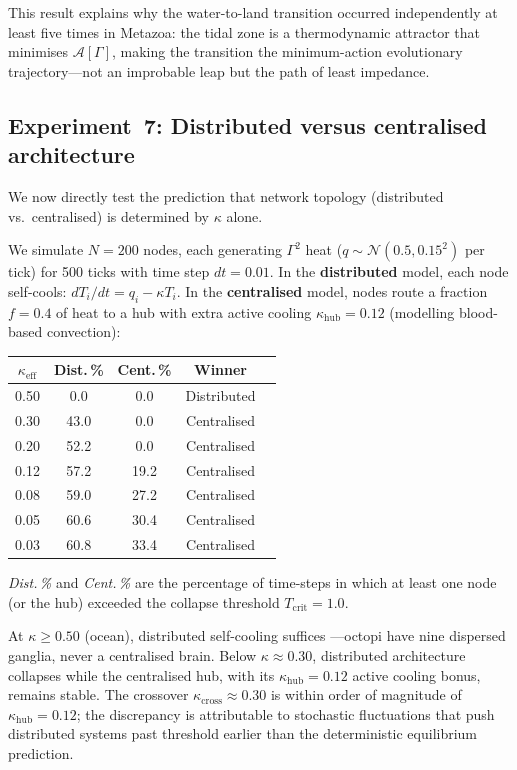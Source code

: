 ﻿\documentclass[aps,pre,twocolumn,superscriptaddress,floatfix]{revtex4-2}
\begin{document}
This result explains why the water-to-land transition occurred
independently at least five times in Metazoa:
the tidal zone is a thermodynamic attractor
that minimises $\mathcal{A}[\Gamma]$, making the transition
the minimum-action evolutionary trajectory---not an
improbable leap but the path of least impedance.


\subsection{Experiment~7: Distributed versus centralised architecture}
\label{sec:exp7}

We now directly test the prediction that network topology
(distributed vs.\ centralised) is determined by $\kappa$ alone.

We simulate $N = 200$ nodes, each generating
$\Gamma^2$ heat ($q \sim \mathcal{N}(0.5, 0.15^2)$ per tick)
for 500 ticks with time step $dt = 0.01$.
In the \textbf{distributed} model, each node self-cools:
$dT_i/dt = q_i - \kappa T_i$.
In the \textbf{centralised} model, nodes route a fraction
$f = 0.4$ of heat to a hub with extra active cooling
$\kappa_{\mathrm{hub}} = 0.12$
(modelling blood-based convection):

\begin{center}
\begin{tabular}{ccccc}
\hline
$\kappa_{\mathrm{eff}}$ & Dist.\,\% & Cent.\,\% & Winner \\
\hline
0.50 &  0.0 &  0.0 & Distributed \\
0.30 & 43.0 &  0.0 & Centralised \\
0.20 & 52.2 &  0.0 & Centralised \\
0.12 & 57.2 & 19.2 & Centralised \\
0.08 & 59.0 & 27.2 & Centralised \\
0.05 & 60.6 & 30.4 & Centralised \\
0.03 & 60.8 & 33.4 & Centralised \\
\hline
\end{tabular}
\end{center}

\noindent
\emph{Dist.\,\%} and \emph{Cent.\,\%} are the percentage
of time-steps in which at least one node (or the hub)
exceeded the collapse threshold $T_{\mathrm{crit}} = 1.0$.

At $\kappa \geq 0.50$ (ocean), distributed self-cooling suffices
---octopi have nine dispersed ganglia, never a centralised brain.
Below $\kappa \approx 0.30$, distributed architecture collapses
while the centralised hub, with its $\kappa_{\mathrm{hub}} = 0.12$
active cooling bonus, remains stable.
The crossover $\kappa_{\mathrm{cross}} \approx 0.30$
is within order of magnitude of
$\kappa_{\mathrm{hub}} = 0.12$;
the discrepancy is attributable to stochastic fluctuations
that push distributed systems past threshold earlier than
the deterministic equilibrium prediction.
\end{document}
